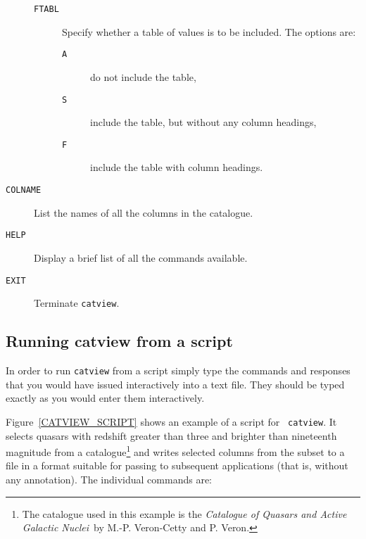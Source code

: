 \documentclass[twoside,11pt]{article}
\renewcommand{\_}{\texttt{\symbol{95}}}
\begin{document}
\begin{description}
\begin{description}
    \item[ {\tt FTABL} ] Specify whether a table of values is to be
     included. The options are:

    \begin{description}

      \item[ {\tt A} ] do not include the table,

      \item[ {\tt S} ] include the table, but without any column
       headings,

      \item[ {\tt F} ] include the table with column headings.

    \end{description}

  \end{description}


  \item[ {\tt COLNAME} ] List the names of all the columns in the
   catalogue.

  \item[ {\tt HELP} ] Display a brief list of all the commands
   available.

  \item[ {\tt EXIT} ] Terminate {\tt catview}.

\end{description}


\subsection{\label{VIEW_SCRIPT}Running catview from a script}

In order to run {\tt catview} from a script simply type the commands and
responses that you would have issued interactively into a text file.
They should be typed exactly as you would enter them interactively.

Figure~\ref{CATVIEW_SCRIPT} shows an example of a script for {\tt
catview}. It selects quasars with redshift greater than three and
brighter than nineteenth magnitude from a catalogue\footnote{The
catalogue used in this example is the {\it Catalogue of Quasars and Active
Galactic Nuclei}\, by M.-P. Veron-Cetty and P. Veron\cite{VERON89}.}
and writes selected columns from the subset to a file in a format suitable
for passing to subsequent applications (that is, without any annotation).
The individual commands are:
\end{document}
